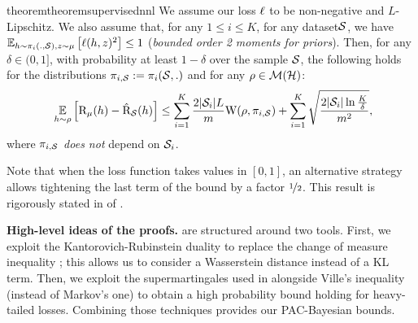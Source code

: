 \documentclass{article}
\begin{document}
\begin{restatable}{theorem}{theoremsupervisednnl}
\label{theorem:supervised-nnl}
We assume our loss $\loss$ to be non-negative and $L$-Lipschitz. We also assume that, for any $1\leq i\leq K$, for any dataset$\S$, we have $\EE_{h\sim \P_{i}(.,\S), z\sim \D}\LB \loss(h,z)^2 \RB \leq 1$ (\emph{bounded order 2 moments for priors}).
Then, for any $\delta\in(0,1]$, with probability at least $1-\delta$ over the sample $\S$, the following holds for the distributions $\P_{i,\S}\defeq \P_i(\S,.)$ and for any $\Q\in\Mcal(\H)$: 
\begin{align*}
\ \EE_{h\sim\Q}\Big[ \Risk_{\D}(h) - \Riskhat_{\S}(h) \Big] \le \sum_{i=1}^{K} \frac{2|\S_i|L}{m} \W(\Q, \P_{i,\S}) + \sum_{i=1}^{K} \sqrt{\frac{2|\S_i|\ln\frac{K}{\delta}}{m^2}}, 
\end{align*}
where $\P_{i,\S}$ {\it does not} depend on $\S_i$.
\end{restatable}

Note that when the loss function takes values in $[0,1]$, an alternative strategy allows tightening the last term of the bound by a factor $\nicefrac{1}{2}$.
This result is rigorously stated in  of . 

\textbf{High-level ideas of the proofs.}
 are structured around two tools.
First, we exploit the Kantorovich-Rubinstein duality \cite[Remark 6.5]{villani2009optimal} to replace the change of measure inequality \cite{csizar1975divergence,donsker1976asymptotic}; this allows us to consider a Wasserstein distance instead of a KL term.
Then, we exploit the supermartingales used in \cite{haddouche2023pac,chugg2023unified} alongside Ville's inequality (instead of Markov's one) to obtain a high probability bound holding for heavy-tailed losses.
Combining those techniques provides our PAC-Bayesian bounds.
\end{document}
